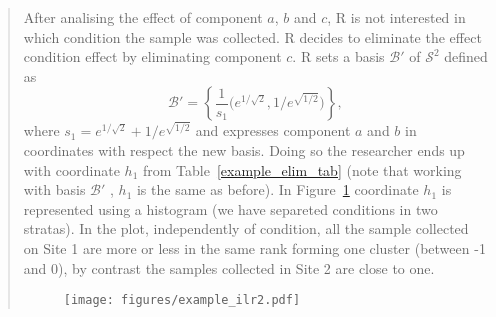 \documentclass[10pt, a4paper]{article}
\begin{document}
\begin{quote}
After analising the effect of component $a$, $b$ and $c$, R is not interested in which condition the sample was collected. R decides to eliminate the effect condition effect by eliminating component $c$. R sets a basis $\mathcal{B}'$ of $\mathcal{S}^2$ defined as
\begin{equation}
\mathcal{B}' = \left\{ \frac{1}{s_1}\Big( e^{1/\sqrt{2}}, 1/e^{\sqrt{1/2}} \Big) \right\},
\end{equation}
where $s_1 = e^{1/\sqrt{2}} + 1/e^{\sqrt{ 1/2}}$ and expresses component $a$ and $b$ in coordinates with respect the new basis. Doing so the researcher ends up with coordinate $h_1$ from Table~\ref{example_elim_tab} (note that working with basis $\mathcal{B}'$ , $h_1$ is the same as before). In Figure~\ref{example_ilr2} coordinate $h_1$ is represented using a histogram (we have separeted conditions in two stratas). In the plot, independently of condition, all the sample collected on Site 1 are more or less in the same rank forming one cluster (between -1 and 0), by contrast the samples collected in Site 2 are close to one.

\begin{figure}[thbp]
\centering
\texttt{[image: figures/example\_ilr2.pdf]}
\caption{}\label{example_ilr2}
\end{figure}
% 

\end{quote}



% 
\end{document}
